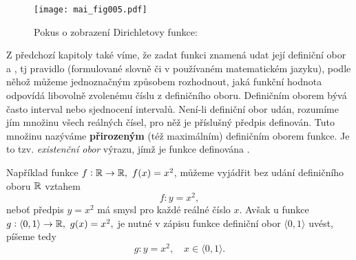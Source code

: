       \begin{figure}[ht!] %
        \centering
%       
        \texttt{[image: mai\_fig005.pdf]}
        \caption{Pokus o zobrazení Dirichletovy funkce: }
        \label{mai_fig005}
      \end{figure}      
      Z předchozí kapitoly také víme, že zadat funkci znamená udat její definiční obor a 
      , tj pravidlo (formulované slovně či v používaném matematickém 
      jazyku), podle něhož můžeme jednoznačným způsobem rozhodnout, jaká funkční hodnota odpovídá 
      libovolně zvolenému číslu z definičního oboru. Definičním oborem bývá často interval nebo 
      sjednocení intervalů. Není-li definiční obor udán, rozumíme jím množinu všech reálných čísel, 
      pro něž je příslušný předpis definován. Tuto množinu nazýváme \textbf{přirozeným} (též 
      maximálním) definičním oborem funkce. Je to tzv. \emph{existenční obor} výrazu, jímž je 
      funkce definována \cite[s.~84]{Brabec1989}.
      
      Například funkce $f: \mathbb{R}\rightarrow\mathbb{R},\ f(x)=x^2$, můžeme vyjádřit bez udání 
      definičního oboru $\mathbb{R}$ vztahem 
      \begin{equation*}
        f: y=x^2,
      \end{equation*}
      neboť předpis $y=x^2$ má smysl pro každé reálné číslo $x$. Avšak u funkce $g:\langle0, 
      1\rangle\rightarrow\mathbb{R},\ g(x)=x^2,$ je nutné v zápisu funkce definiční obor $\langle0, 
      1\rangle$ 
      uvést, píšeme tedy   
      \begin{equation*}
        g: y=x^2, \quad x\in\langle0,1\rangle.
      \end{equation*}
       
        
      
        
      
